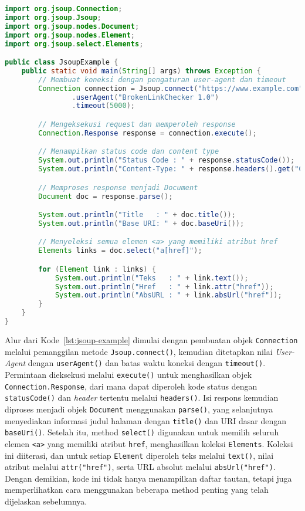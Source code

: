 \begin{lstlisting}[language=Java, caption={Contoh Penggunaan Jsoup}, label={lst:jsoup-example}]
import org.jsoup.Connection;
import org.jsoup.Jsoup;
import org.jsoup.nodes.Document;
import org.jsoup.nodes.Element;
import org.jsoup.select.Elements;

public class JsoupExample {
    public static void main(String[] args) throws Exception {
        // Membuat koneksi dengan pengaturan user-agent dan timeout
        Connection connection = Jsoup.connect("https://www.example.com")
                .userAgent("BrokenLinkChecker 1.0")
                .timeout(5000);

        // Mengeksekusi request dan memperoleh response
        Connection.Response response = connection.execute();

        // Menampilkan status code dan content type
        System.out.println("Status Code : " + response.statusCode());
        System.out.println("Content-Type: " + response.headers().get("Content-Type"));

        // Memproses response menjadi Document
        Document doc = response.parse();

        System.out.println("Title   : " + doc.title());
        System.out.println("Base URI: " + doc.baseUri());

        // Menyeleksi semua elemen <a> yang memiliki atribut href
        Elements links = doc.select("a[href]");

        for (Element link : links) {
            System.out.println("Teks   : " + link.text());
            System.out.println("Href   : " + link.attr("href"));
            System.out.println("AbsURL : " + link.absUrl("href"));
        }
    }
}
\end{lstlisting}

Alur dari Kode~\ref{lst:jsoup-example} dimulai dengan pembuatan objek \texttt{Connection} melalui pemanggilan metode \texttt{Jsoup.connect()}, kemudian ditetapkan nilai \textit{User-Agent} dengan \texttt{userAgent()} dan batas waktu koneksi dengan \texttt{timeout()}. Permintaan dieksekusi melalui \texttt{execute()} untuk menghasilkan objek \texttt{Connection.Response}, dari mana dapat diperoleh kode status dengan \texttt{statusCode()} dan \textit{header} tertentu melalui \texttt{headers()}. Isi respons kemudian diproses menjadi objek \texttt{Document} menggunakan \texttt{parse()}, yang selanjutnya menyediakan informasi judul halaman dengan \texttt{title()} dan URI dasar dengan \texttt{baseUri()}. Setelah itu, method \texttt{select()} digunakan untuk memilih seluruh elemen \texttt{<a>} yang memiliki atribut \texttt{href}, menghasilkan koleksi \texttt{Elements}. Koleksi ini diiterasi, dan untuk setiap \texttt{Element} diperoleh teks melalui \texttt{text()}, nilai atribut melalui \texttt{attr("href")}, serta URL absolut melalui \texttt{absUrl("href")}. Dengan demikian, kode ini tidak hanya menampilkan daftar tautan, tetapi juga memperlihatkan cara menggunakan beberapa method penting yang telah dijelaskan sebelumnya.
